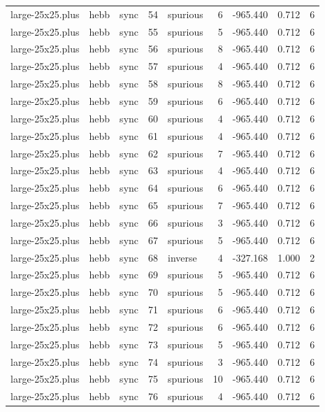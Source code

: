 \begin{tabular}{lllrlrrrr}
large-25x25.plus & hebb & sync & 54 & spurious & 6 & -965.440 & 0.712 & 6 \\
large-25x25.plus & hebb & sync & 55 & spurious & 5 & -965.440 & 0.712 & 6 \\
large-25x25.plus & hebb & sync & 56 & spurious & 8 & -965.440 & 0.712 & 6 \\
large-25x25.plus & hebb & sync & 57 & spurious & 4 & -965.440 & 0.712 & 6 \\
large-25x25.plus & hebb & sync & 58 & spurious & 8 & -965.440 & 0.712 & 6 \\
large-25x25.plus & hebb & sync & 59 & spurious & 6 & -965.440 & 0.712 & 6 \\
large-25x25.plus & hebb & sync & 60 & spurious & 4 & -965.440 & 0.712 & 6 \\
large-25x25.plus & hebb & sync & 61 & spurious & 4 & -965.440 & 0.712 & 6 \\
large-25x25.plus & hebb & sync & 62 & spurious & 7 & -965.440 & 0.712 & 6 \\
large-25x25.plus & hebb & sync & 63 & spurious & 4 & -965.440 & 0.712 & 6 \\
large-25x25.plus & hebb & sync & 64 & spurious & 6 & -965.440 & 0.712 & 6 \\
large-25x25.plus & hebb & sync & 65 & spurious & 7 & -965.440 & 0.712 & 6 \\
large-25x25.plus & hebb & sync & 66 & spurious & 3 & -965.440 & 0.712 & 6 \\
large-25x25.plus & hebb & sync & 67 & spurious & 5 & -965.440 & 0.712 & 6 \\
large-25x25.plus & hebb & sync & 68 & inverse & 4 & -327.168 & 1.000 & 2 \\
large-25x25.plus & hebb & sync & 69 & spurious & 5 & -965.440 & 0.712 & 6 \\
large-25x25.plus & hebb & sync & 70 & spurious & 5 & -965.440 & 0.712 & 6 \\
large-25x25.plus & hebb & sync & 71 & spurious & 6 & -965.440 & 0.712 & 6 \\
large-25x25.plus & hebb & sync & 72 & spurious & 6 & -965.440 & 0.712 & 6 \\
large-25x25.plus & hebb & sync & 73 & spurious & 5 & -965.440 & 0.712 & 6 \\
large-25x25.plus & hebb & sync & 74 & spurious & 3 & -965.440 & 0.712 & 6 \\
large-25x25.plus & hebb & sync & 75 & spurious & 10 & -965.440 & 0.712 & 6 \\
large-25x25.plus & hebb & sync & 76 & spurious & 4 & -965.440 & 0.712 & 6 \\

\end{tabular}
